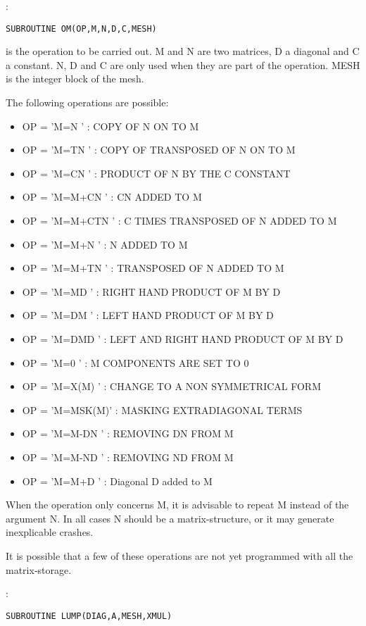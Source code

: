 :
\begin{lstlisting}[language=TelFortran]
SUBROUTINE OM(OP,M,N,D,C,MESH)
\end{lstlisting}

 is the operation to be carried out. M and N are two matrices, D a diagonal
and C a constant. N, D and C are only used when they are part of the operation.
MESH is the integer block of the mesh.

The following operations are possible:
\begin{itemize}
  \item OP = 'M=N     ' : COPY OF N ON TO M
  \item OP = 'M=TN    ' : COPY OF TRANSPOSED OF N ON TO M
  \item OP = 'M=CN    ' : PRODUCT OF N BY THE C CONSTANT
  \item OP = 'M=M+CN  ' : CN ADDED TO M
  \item OP = 'M=M+CTN ' : C TIMES TRANSPOSED OF N ADDED TO M
  \item OP = 'M=M+N   ' : N ADDED TO M
  \item OP = 'M=M+TN  ' : TRANSPOSED OF N ADDED TO M
  \item OP = 'M=MD    ' : RIGHT HAND PRODUCT OF M BY D
  \item OP = 'M=DM    ' : LEFT HAND PRODUCT OF M BY D
  \item OP = 'M=DMD   ' : LEFT AND RIGHT HAND PRODUCT OF M BY D
  \item OP = 'M=0     ' : M COMPONENTS ARE SET TO 0
  \item OP = 'M=X(M)  ' : CHANGE TO A NON SYMMETRICAL FORM
  \item OP = 'M=MSK(M)' : MASKING EXTRADIAGONAL TERMS
  \item OP = 'M=M-DN  ' : REMOVING DN FROM M
  \item OP = 'M=M-ND  ' : REMOVING ND FROM M
  \item OP = 'M=M+D   ' : Diagonal D added to M
\end{itemize}

When the operation only concerns M, it is advisable to repeat M instead of the
argument N. In all cases N should be a matrix-structure, or it may generate
inexplicable crashes.

It is possible that a few of these operations are not yet programmed with all
the matrix-storage.

:
\begin{lstlisting}[language=TelFortran]
SUBROUTINE LUMP(DIAG,A,MESH,XMUL)
\end{lstlisting}

